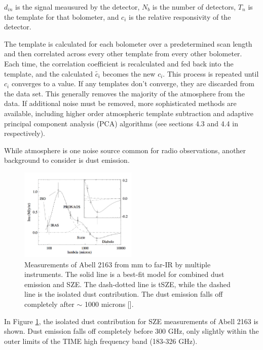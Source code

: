 \documentclass[manuscript]{aastex}
\begin{document}
$d_{in}$ is the signal meausured by the detector, $N_{b}$ is the number of detectors, $T_{n}$ is the template for that bolometer, and $c_{i}$ is the relative responsivity of the detector.

The template is calculated for each bolometer over a predetermined scan length and then correlated across every other template from every other bolometer. Each time, the correlation coefficient is recalculated and fed back into the template, and the calculated $\tilde{c_{i}}$ becomes the new $c_{i}$. This process is repeated until $c_{i}$ converges to a value. If any templates don't converge, they are discarded from the data set. This generally removes the majority of the atmosphere from the data. If additional noise must be removed, more sophisticated methods are available, including higher order atmospheric template subtraction and adaptive principal component analysis (PCA) algorithms (see sections 4.3 and 4.4 in \cite{Sayers2010} respectively).

While atmosphere is one noise source common for radio observations, another background to consider is dust emission.
\begin{figure}
\vspace{-0.8cm}
  \begin{center}
    \includegraphics[width=0.5\textwidth]{birkinshaw1.png}
   \end{center}
\caption[TIME's frequency window will be mostly free of dust emission contamination. -(\cite{Birkinshaw1999})]{Measurements of Abell 2163 from mm to far-IR by multiple instruments. The solid line is a best-fit model for combined dust emission and SZE. The dash-dotted line is tSZE, while the dashed line is the isolated dust contribution. The dust emission falls off completely after $\sim$ 1000 microns [\cite{Birkinshaw1999}].}
\label{fig:dust}
\end{figure}
In Figure \ref{fig:dust}, the isolated dust contribution for SZE measurements of Abell 2163 is shown. Dust emission falls off completely before 300 GHz, only slightly within the outer limits of the TIME high frequency band (183-326 GHz). 
\end{document}
